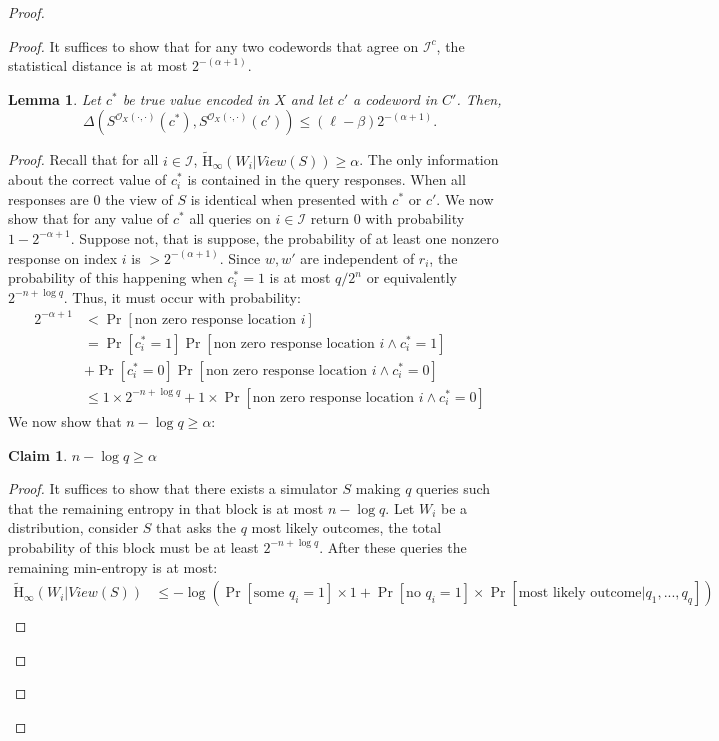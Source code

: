 \documentclass[11pt]{article}
\newcommand{\Hav}{\tilde{\mathrm{H}}_\infty}
\newtheorem{lemma}[theorem]{Lemma}
\newtheorem{claim}[theorem]{Claim}
\begin{document}
\begin{proof}
\begin{proof}
\noindent It suffices to show that for any two codewords that agree on $\mathcal{I}^c$, the statistical distance is at most $2^{-(\alpha+1)}$.
\begin{lemma}
\label{lem:codewords in I close}
Let $c^*$ be true value encoded in $X$ and let $c'$ a codeword in $C'$.  Then,
\[
\Delta( S^{\mathcal{O}_X(\cdot, \cdot)}(c^*), S^{\mathcal{O}_X(\cdot, \cdot)}(c')) \le ( \ell -\beta) 2^{-(\alpha+1)}.
\]
\end{lemma}
\begin{proof}
Recall that for all $i\in \mathcal{I}$, $\Hav(W_i | View(S))\geq \alpha$.  The only information about the correct value of $c_i^*$ is contained in the query responses.  When all responses are $0$ the view of $S$ is identical when presented with $c^*$ or $c'$.  We now show that for any value of $c^*$ all queries on $i \in \mathcal{I}$ return $0$ with probability $1-2^{-\alpha+1}$.  Suppose not, that is suppose, the probability of at least one nonzero response on index $i$ is $> 2^{-(\alpha+1)}$.  Since $w, w'$ are independent of $r_i$, the probability of this happening when $c^*_i = 1$ is at most $q/2^n$ or equivalently $2^{-n+\log q}$.  Thus, it must occur with probability:
\begin{align}
2^{-\alpha+1}&<\Pr[\text{non zero response location }i]\nonumber \\
 &= \Pr[c_i^* =1]\Pr[\text{non zero response location }i\wedge c_i^*=1]\nonumber \\&+ \Pr[c_i^*=0] \Pr[\text{non zero response location }i \wedge c_i^*=0]\nonumber \\
&\le 1\times 2^{-n+\log q} + 1\times  \Pr[\text{non zero response location }i \wedge c_i^*=0] \label{eq:ways to remove ent}
\end{align}
We now show that $n-\log q \geq \alpha$:
\begin{claim}
\label{cl:ent bounded away from n}
$n-\log q \geq \alpha$
\end{claim}
\begin{proof}
It suffices to show that there exists a simulator $S$ making $q$ queries such that the remaining entropy in that block is at most $n-\log q$.  Let $W_i$ be a distribution, consider $S$ that asks the $q$ most likely outcomes, the total probability of this block must be at least $2^{-n+\log q}$.  After these queries the remaining min-entropy is at most:
\begin{align*}
\Hav(W_i | View(S)) &\leq  -\log \left(\Pr[\text{some }q_i=1]\times 1+ \Pr[\text{no }q_i=1]\times \Pr[\text{most likely outcome}|q_1,...,q_q]\right)\\

\end{align*}
\end{proof}
\end{proof}
\end{proof}
\end{proof}
\end{document}
